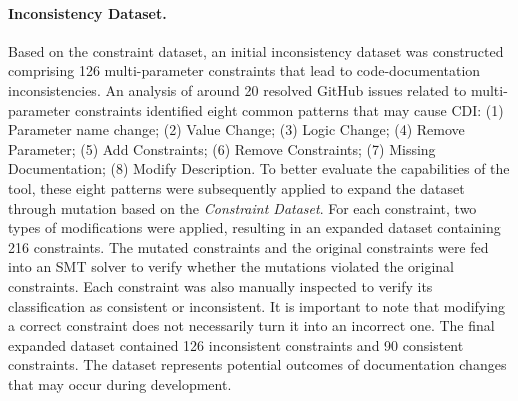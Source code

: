 \paragraph{Inconsistency Dataset.}
Based on the constraint dataset, an initial inconsistency dataset was constructed comprising 126 multi-parameter constraints that lead to code-documentation inconsistencies. An analysis of around 20 resolved GitHub issues related to multi-parameter constraints identified eight common patterns that may cause CDI: (1) Parameter name change; (2) Value Change; (3) Logic Change; (4) Remove Parameter; (5) Add Constraints; (6) Remove Constraints; (7) Missing Documentation; (8) Modify Description. To better evaluate the capabilities of the tool, these eight patterns were subsequently applied to expand the dataset through mutation based on the \emph{Constraint Dataset}. For each constraint, two types of modifications were applied, resulting in an expanded dataset containing 216 constraints. The mutated constraints and the original constraints were fed into an SMT solver to verify whether the mutations violated the original constraints. Each constraint was also manually inspected to verify its classification as consistent or inconsistent. It is important to note that modifying a correct constraint does not necessarily turn it into an incorrect one. The final expanded dataset contained 126 inconsistent constraints and 90 consistent constraints. The dataset represents potential outcomes of documentation changes that may occur during development.

